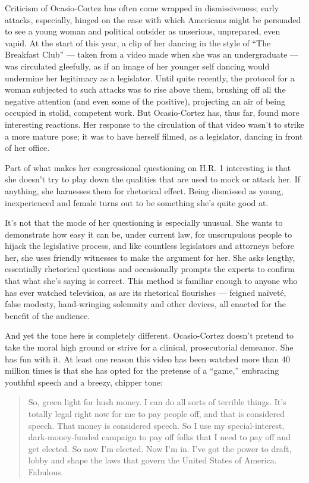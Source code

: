 Criticism of Ocasio-Cortez has often come wrapped in dismissiveness;
early attacks, especially, hinged on the ease with which Americans might
be persuaded to see a young woman and political outsider as unserious,
unprepared, even vapid. At the start of this year, a clip of her dancing
in the style of ``The Breakfast Club'' --- taken from a video made when
she was an undergraduate --- was circulated gleefully, as if an image of
her younger self dancing would undermine her legitimacy as a legislator.
Until quite recently, the protocol for a woman subjected to such attacks
was to rise above them, brushing off all the negative attention (and
even some of the positive), projecting an air of being occupied in
stolid, competent work. But Ocasio-Cortez has, thus far, found more
interesting reactions. Her response to the circulation of that video
wasn't to strike a more mature pose; it was to have herself filmed, as a
legislator, dancing in front of her office.

Part of what makes her congressional questioning on H.R. 1 interesting
is that she doesn't try to play down the qualities that are used to mock
or attack her. If anything, she harnesses them for rhetorical effect.
Being dismissed as young, inexperienced and female turns out to be
something she's quite good at.

It's not that the mode of her questioning is especially unusual. She
wants to demonstrate how easy it can be, under current law, for
unscrupulous people to hijack the legislative process, and like
countless legislators and attorneys before her, she uses friendly
witnesses to make the argument for her. She asks lengthy, essentially
rhetorical questions and occasionally prompts the experts to confirm
that what she's saying is correct. This method is familiar enough to
anyone who has ever watched television, as are its rhetorical flourishes
--- feigned naïveté, false modesty, hand-wringing solemnity and other
devices, all enacted for the benefit of the audience.

And yet the tone here is completely different. Ocasio-Cortez doesn't
pretend to take the moral high ground or strive for a clinical,
prosecutorial demeanor. She has fun with it. At least one reason this
video has been watched more than 40 million times is that she has opted
for the pretense of a ``game,'' embracing youthful speech and a breezy,
chipper tone:

\begin{quote}
So, green light for hush money. I can do all sorts of terrible things.
It's totally legal right now for me to pay people off, and that is
considered speech. That money is considered speech. So I use my
special-interest, dark-money-funded campaign to pay off folks that I
need to pay off and get elected. So now I'm elected. Now I'm in. I've
got the power to draft, lobby and shape the laws that govern the United
States of America. Fabulous.
\end{quote}

